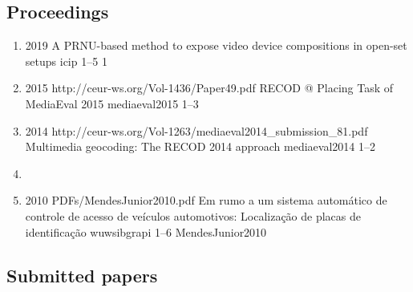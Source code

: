 \subsection*{Proceedings}

\begin{enumerate}[resume]
\item{}
  {
  }
  {2019}
  {}
  {A PRNU-based method to expose video device compositions in open-set setups}
  {icip}
  {1--5}
  {1}
  {}
\item{}
  {
  }
  {2015}
  {http://ceur-ws.org/Vol-1436/Paper49.pdf}
  {RECOD @ Placing Task of MediaEval 2015}
  {mediaeval2015}
  {1--3}
  {}
  {}
\item{}
  {
  }
  {2014}
  {http://ceur-ws.org/Vol-1263/mediaeval2014_submission_81.pdf}
  {Multimedia geocoding: The RECOD 2014 approach}
  {mediaeval2014}
  {1--2}
  {}
  {}
\item{}
\item{}
  {
  }
  {2010}
  {PDFs/MendesJunior2010.pdf}
  {Em rumo a um sistema automático de controle de acesso de veículos automotivos: Localização de placas de identificação}
  {wuwsibgrapi}
  {1--6}
  {}
  {MendesJunior2010}
\end{enumerate}

\subsection*{Submitted papers}


